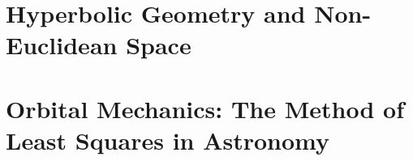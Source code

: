 \documentclass[12pt,oneside]{book}
\begin{document}
\chapter{Hyperbolic Geometry and Non-Euclidean Space}
\label{ch:hyperbolic}


\chapter{Orbital Mechanics: The Method of Least Squares in Astronomy}
\label{ch:orbital}


\appendix





\printbibliography

\printindex


\end{document}
